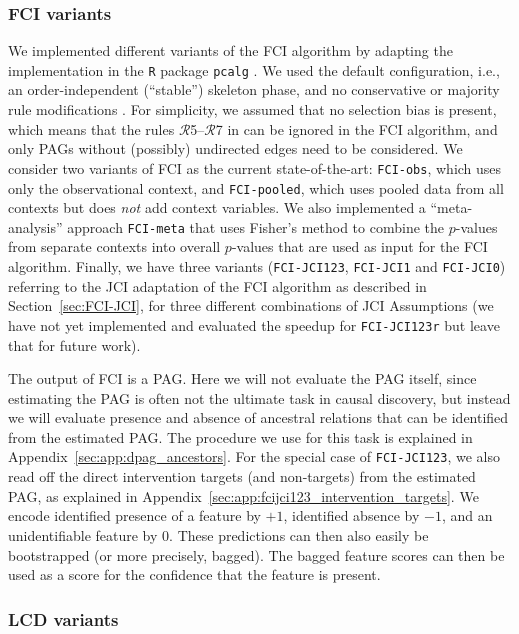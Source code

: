 \documentclass[twoside,11pt]{article}
\newcommand{\alg}[1]{\texttt{#1}}
\begin{document}
\subsubsection{FCI variants}
We implemented different variants of the FCI algorithm by adapting the implementation in the
\texttt{R} package \texttt{pcalg} \citep{pcalg}. We used the default configuration, i.e., an order-independent
(``stable'') skeleton phase, and no conservative or majority rule modifications \citep{colombo2014order}.
For simplicity, we assumed that no selection bias is present, which 
means that the rules $\mathcal{R}$5--$\mathcal{R}$7 in \citet{Zhang2008_AI} can
be ignored in the FCI algorithm, and only PAGs without (possibly) undirected edges need to be considered.
We consider two variants of FCI as the current state-of-the-art:
\alg{FCI-obs}, which uses only the observational context, and \alg{FCI-pooled}, which uses 
pooled data from all contexts but does \emph{not} add context variables. We also implemented
a ``meta-analysis'' approach \alg{FCI-meta} that uses Fisher's method to combine the $p$-values
from separate contexts into overall $p$-values that are used as input for the FCI algorithm.
Finally, we have three variants (\alg{FCI-JCI123}, \alg{FCI-JCI1} and \alg{FCI-JCI0}) 
referring to the JCI adaptation of the FCI algorithm as described in Section~\ref{sec:FCI-JCI},
for three different combinations of JCI Assumptions (we have not yet implemented and evaluated the speedup for
\alg{FCI-JCI123r} but leave that for future work).

The output of FCI is a PAG. Here we will not evaluate the PAG itself, since estimating the PAG
is often not the ultimate task in causal discovery, but instead we will evaluate 
presence and absence of ancestral relations that can be identified from the estimated PAG. 
The procedure we use for this task is explained in Appendix~\ref{sec:app:dpag_ancestors}.
For the special case of \alg{FCI-JCI123}, we also read off the direct intervention
targets (and non-targets) from the estimated PAG, as explained in Appendix~\ref{sec:app:fcijci123_intervention_targets}.
We encode identified presence of a feature by $+1$, identified absence by $-1$, and an unidentifiable
feature by $0$. These predictions can then also easily be bootstrapped (or more precisely,
bagged). The bagged feature scores can then be used as a score for the confidence that
the feature is present.

\subsubsection{LCD variants}
\end{document}
